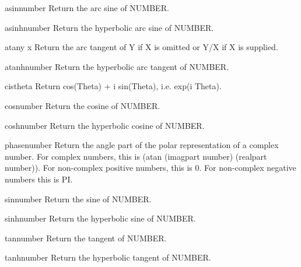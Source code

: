 \documentclass[10pt,english]{book}
\begin{document}
\begin{function}{asin}{number}
  Return the arc sine of NUMBER.
\end{function}

\begin{function}{asinh}{number}
  Return the hyperbolic arc sine of NUMBER.
\end{function}

\begin{function}{atan}{y \op x}
  Return the arc tangent of Y if X is omitted or Y/X if X is supplied.
\end{function}

\begin{function}{atanh}{number}
  Return the hyperbolic arc tangent of NUMBER.
\end{function}

\begin{function}{cis}{theta}
  Return cos(Theta) + i sin(Theta), i.e. exp(i Theta).
\end{function}

\begin{function}{cos}{number}
  Return the cosine of NUMBER.
\end{function}

\begin{function}{cosh}{number}
  Return the hyperbolic cosine of NUMBER.
\end{function}

\begin{function}{phase}{number}
  Return the angle part of the polar representation of a complex number.
  For complex numbers, this is (atan (imagpart number) (realpart number)).
  For non-complex positive numbers, this is 0. For non-complex negative
  numbers this is PI.
\end{function}

\begin{function}{sin}{number}
  Return the sine of NUMBER.
\end{function}

\begin{function}{sinh}{number}
  Return the hyperbolic sine of NUMBER.
\end{function}

\begin{function}{tan}{number}
  Return the tangent of NUMBER.
\end{function}

\begin{function}{tanh}{number}
  Return the hyperbolic tangent of NUMBER.
\end{function}
\end{document}
